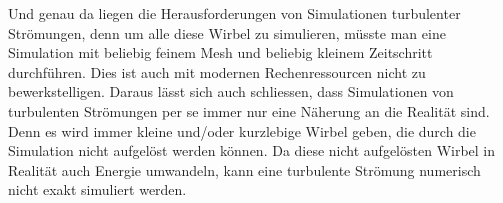 \begin{refsection}
Und genau da liegen die Herausforderungen von Simulationen turbulenter Strömungen,
denn um alle diese Wirbel zu simulieren, müsste man eine Simulation mit beliebig feinem Mesh und beliebig kleinem Zeitschritt durchführen.
%
%
Dies ist auch mit modernen Rechenressourcen nicht zu bewerkstelligen.
Daraus lässt sich auch schliessen, dass Simulationen von turbulenten Strömungen per se immer nur eine Näherung an die Realität sind.
Denn es wird immer kleine und/oder kurzlebige Wirbel geben, die durch die Simulation nicht aufgelöst werden können.
Da diese nicht aufgelösten Wirbel in Realität auch Energie umwandeln, kann eine turbulente Strömung numerisch nicht exakt simuliert werden.







\printbibliography[heading=subbibliography]
\end{refsection}
